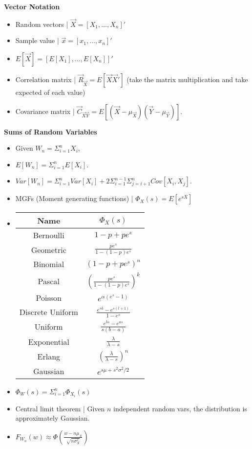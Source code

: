 \documentclass[8pt]{article}
\begin{document}
\textbf{Vector Notation}
\begin{itemize}
    \item Random vectors | $\vec{X} = [X_1, \dots, X_n]'$
    \item Sample value | $\vec{x} = [x_1, \dots, x_n]'$
    \item $E[\vec{X}] = [E[X_1], \dots, E[X_n]]'$
    \item Correlation matrix | $\vec{R}_{\vec{X}} = E[\vec{X}\vec{X}']$ (take the matrix multiplication and take expected of each value)
    \item Covariance matrix | $\vec{C}_{\vec{X}\vec{Y}} = E[(\vec{X} - \mu_{\vec{X}})(\vec{Y} - \mu_{\vec{Y}})]$.
\end{itemize}
\textbf{Sums of Random Variables}
\begin{itemize}
    \item Given $W_n = \Sigma_{i = 1}^n X_i$,
    \item $E[W_n] = \Sigma_{i = 1}^n E[X_i]$.
    \item $Var[W_n] = \Sigma_{i = 1}^n Var[X_i] + 2 \Sigma_{i = 1}^{n - 1} \Sigma_{j = i + 1}^n Cov[X_i, X_j]$.
    \item MGFs (Moment generating functions) | $\Phi_X(s) = E[e^{sX}]$
    \item
    \begin{tabular}{|c|c|}
        \hline
        Name & $\Phi_X(s)$ \\
        \hline
        Bernoulli & $1 - p + pe^s$ \\
        Geometric & $\frac{pe^s}{1 - (1 - p)e^s}$ \\
        Binomial & $(1 - p + pe^s)^n$  \\
        Pascal & $(\frac{pe^s}{1 - (1 - p)e^s})^k$ \\
        Poisson & $e^{\alpha(e^s - 1)}$ \\
        Discrete Uniform & $\frac{e^{sk} - e^{s(l + 1)}}{1 - e^s}$ \\
        Uniform & $\frac{e^{bs} - e^{as}}{s(b - a)}$ \\
        Exponential & $\frac{\lambda}{\lambda - s}$ \\
        Erlang & $\left(\frac{\lambda}{\lambda - s}\right)^n$ \\
        Gaussian & $e^{s\mu + s^2\sigma^2/2}$ \\
        \hline
    \end{tabular}
    \item $\Phi_W(s) = \Sigma_{i = 1}^n \Phi_{X_i}(s)$
    \item Central limit theorem | Given $n$ independent random vars, the distribution is approximately Gaussian.
    \item $F_{W_n}(w) \approx \Phi\left(\frac{w - n \mu_X}{\sqrt{n \sigma_X^2}}\right)$
\end{itemize}
\end{document}
